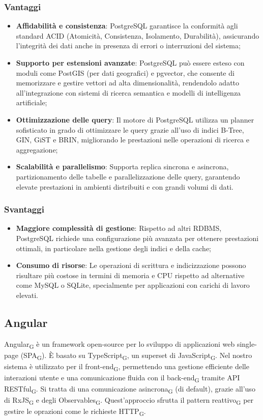 \subsubsection{Vantaggi}
\begin{itemize}
    \item \textbf{Affidabilità e consistenza}: PostgreSQL garantisce la conformità agli standard ACID (Atomicità, Consistenza, Isolamento, Durabilità), assicurando l’integrità dei dati anche in presenza di errori o interruzioni del sistema;
    \item \textbf{Supporto per estensioni avanzate}: PostgreSQL può essere esteso con moduli come PostGIS (per dati geografici) e pgvector, che consente di memorizzare e gestire vettori ad alta dimensionalità, rendendolo adatto all’integrazione con sistemi di ricerca semantica e modelli di intelligenza artificiale;
    \item \textbf{Ottimizzazione delle query}: Il motore di PostgreSQL utilizza un planner sofisticato in grado di ottimizzare le query grazie all’uso di indici B-Tree, GIN, GiST e BRIN, migliorando le prestazioni nelle operazioni di ricerca e aggregazione;
    \item \textbf{Scalabilità e parallelismo}: Supporta replica sincrona e asincrona, partizionamento delle tabelle e parallelizzazione delle query, garantendo elevate prestazioni in ambienti distribuiti e con grandi volumi di dati.
\end{itemize}
\subsubsection{Svantaggi}
\begin{itemize}
    \item \textbf{Maggiore complessità di gestione}: Rispetto ad altri RDBMS, PostgreSQL richiede una configurazione più avanzata per ottenere prestazioni ottimali, in particolare nella gestione degli indici e della cache;
    \item \textbf{Consumo di risorse}: Le operazioni di scrittura e indicizzazione possono risultare più costose in termini di memoria e CPU rispetto ad alternative come MySQL o SQLite, specialmente per applicazioni con carichi di lavoro elevati.
\end{itemize}

\subsection{Angular}
Angular\textsubscript{G} è un framework open-source per lo sviluppo di applicazioni web single-page (SPA\textsubscript{G}). È basato su TypeScript\textsubscript{G}, un superset di JavaScript\textsubscript{G}. Nel nostro sistema è utilizzato per il front-end\textsubscript{G}, permettendo una gestione efficiente delle interazioni utente e una comunicazione fluida con il back-end\textsubscript{G} tramite API RESTful\textsubscript{G}. Si tratta di una comunicazione asincrona\textsubscript{G} (di default), grazie all'uso di RxJS\textsubscript{G} e degli Observables\textsubscript{G}. Quest'approccio sfrutta il pattern reattivo\textsubscript{G} per gestire le oprazioni come le richieste HTTP\textsubscript{G}. 

